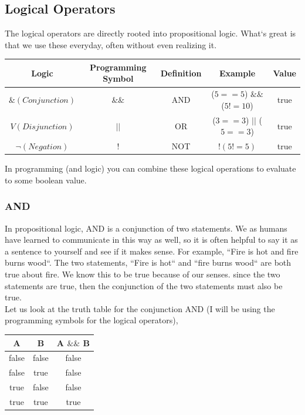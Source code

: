 \documentclass[11]{article}
\begin{document}
\subsection{Logical Operators}
The logical operators are directly rooted into propositional logic. What`s great is that we use these everyday, often without even realizing it.

\begin{center}
  \begin{tabular}{ | c | c | c | c | c |}
    \hline
    Logic & Programming Symbol & Definition & Example & Value \\ \hline
    $\& (Conjunction)$ & $\&\&$ & AND & ($5==5$) $\&\&$ ($5!=10$) & true \\ \hline
    $V (Disjunction)$ & $||$ & OR & ($3==3$) $||$ ($5==3$) & true \\ \hline
    $\lnot (Negation)$ & $!$ & NOT &  $!(5 != 5)$ & true \\ 
    \hline
  \end{tabular}
\end{center}

In programming (and logic) you can combine these logical operations to evaluate to some boolean value.\\

\subsubsection{AND}
In propositional logic, AND is a conjunction of two statements. We as humans have learned to communicate in this way as well, so it is often helpful to say it as a sentence to yourself and see if it makes sense. For example, ``Fire is hot and fire burns wood``. The two statements, ``Fire is hot`` and ``fire burns wood`` are both true about fire. We know this to be true because of our senses. since the two statements are true, then the conjunction of the two statements must also be true.\\

Let us look at the truth table for the conjunction AND (I will be using the programming symbols for the logical operators),
\begin{center}
  \begin{tabular}{ | c | c | c |}
    \hline
    A & B & A $\&\&$ B \\ \hline
    false & false & false \\ \hline
    false & true & false \\ \hline
    true & false & false \\ \hline
    true & true & true \\
    \hline
  \end{tabular}
\end{center}
\end{document}
